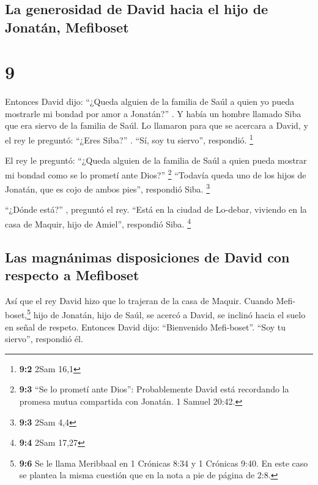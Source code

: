 \hypertarget{la-generosidad-de-david-hacia-el-hijo-de-jonatuxe1n-mefiboset}{%
\subsection{La generosidad de David hacia el hijo de Jonatán,
Mefiboset}\label{la-generosidad-de-david-hacia-el-hijo-de-jonatuxe1n-mefiboset}}

\hypertarget{section-8}{%
\section{9}\label{section-8}}

 Entonces David dijo: ``¿Queda alguien de la familia de
Saúl a quien yo pueda mostrarle mi bondad por amor a Jonatán?'' .
 Y había un hombre llamado Siba que era siervo de la
familia de Saúl. Lo llamaron para que se acercara a David, y el rey le
preguntó: ``¿Eres Siba?'' . ``Sí, soy tu siervo'', respondió.
\footnote{\textbf{9:2} 2Sam 16,1}

 El rey le preguntó: ``¿Queda alguien de la familia de
Saúl a quien pueda mostrar mi bondad como se lo prometí ante Dios?''
\footnote{\textbf{9:3} ``Se lo prometí ante Dios'': Probablemente David
  está recordando la promesa mutua compartida con Jonatán. 1 Samuel
  20:42.} ``Todavía queda uno de los hijos de Jonatán, que es cojo de
ambos pies'', respondió Siba. \footnote{\textbf{9:3} 2Sam 4,4}

 ``¿Dónde está?'' , preguntó el rey. ``Está en la ciudad
de Lo-debar, viviendo en la casa de Maquir, hijo de Amiel'', respondió
Siba. \footnote{\textbf{9:4} 2Sam 17,27}

\hypertarget{las-magnuxe1nimas-disposiciones-de-david-con-respecto-a-mefiboset}{%
\subsection{Las magnánimas disposiciones de David con respecto a
Mefiboset}\label{las-magnuxe1nimas-disposiciones-de-david-con-respecto-a-mefiboset}}

 Así que el rey David hizo que lo trajeran de la casa de
Maquir.  Cuando Mefi-boset,\footnote{\textbf{9:6} Se le
  llama Meribbaal en 1 Crónicas 8:34 y 1 Crónicas 9:40. En este caso se
  plantea la misma cuestión que en la nota a pie de página de 2:8.} hijo
de Jonatán, hijo de Saúl, se acercó a David, se inclinó hacia el suelo
en señal de respeto. Entonces David dijo: ``Bienvenido Mefi-boset''.
``Soy tu siervo'', respondió él.

